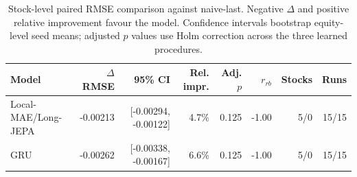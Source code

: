 \begin{table}[t]
\centering
\small
\caption{Stock-level paired RMSE comparison against naive-last. Negative $\Delta$ and positive relative improvement favour the model. Confidence intervals bootstrap equity-level seed means; adjusted $p$ values use Holm correction across the three learned procedures.}
\label{tab:paired_rmse_naive}
\begin{tabular}{lrrrrrrr}
\toprule
Model & $\Delta$RMSE & 95\% CI & Rel. impr. & Adj. $p$ & $r_{rb}$ & Stocks & Runs \\
\midrule
Local-MAE/Long-JEPA & -0.00213 & [-0.00294, -0.00122] & 4.7\% & 0.125 & -1.00 & 5/0 & 15/15 \\
GRU & -0.00262 & [-0.00338, -0.00167] & 6.6\% & 0.125 & -1.00 & 5/0 & 15/15 \\
\bottomrule
\end{tabular}
\end{table}
